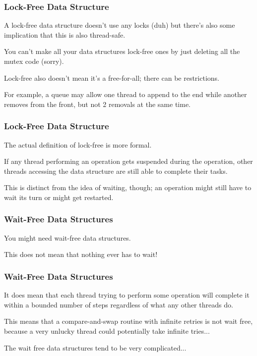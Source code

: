 \begin{frame}
\frametitle{Lock-Free Data Structure}
A lock-free data structure doesn't use any locks (duh) but there's also some implication that this is also thread-safe.

You can't make all your data structures lock-free ones by just deleting all the mutex code (sorry). 

Lock-free also doesn't mean it's a free-for-all; there can be restrictions. 

For example, a queue may allow one thread to append to the end while another removes from the front, but not 2 removals at the same time.
\end{frame}



\begin{frame}
\frametitle{Lock-Free Data Structure}

The actual definition of lock-free is more formal. 

If any thread performing an operation gets suspended during the operation, other threads accessing the data structure are still able to complete their tasks.

This is distinct from the idea of waiting, though; an operation might still have to wait its turn or might get restarted.

\end{frame}



\begin{frame}
\frametitle{Wait-Free Data Structures}

You might need wait-free data structures. 

This does not mean that nothing ever has to wait! 

\end{frame}



\begin{frame}
\frametitle{Wait-Free Data Structures}


It does mean that each thread trying to perform some operation will complete it within a bounded number of steps regardless of what any other threads do. 

This means that a compare-and-swap routine with infinite retries is not wait free, because a very unlucky thread could potentially take infinite tries...

The wait free data structures tend to be very complicated...

\end{frame}


